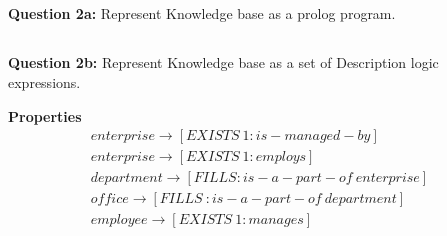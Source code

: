 \documentclass[11pt]{article}
\begin{document}
\subsection{}
\textbf{Question 2a:}
Represent Knowledge base as a prolog program.

\subsection{}
\textbf{Question 2b:}
Represent Knowledge base as a set of Description logic expressions.

\textbf{Properties}
\begin{align*}
	enterprise \rightarrow [EXISTS\ 1 :is-managed-by] \\
	enterprise \rightarrow [EXISTS\ 1 :employs] \\
	department \rightarrow[FILLS :is-a-part-of\ enterprise] \\
	office \rightarrow [FILLS\ :is-a-part-of\ department] \\
	employee \rightarrow [EXISTS\ 1 :manages]
\end{align*}
\end{document}
